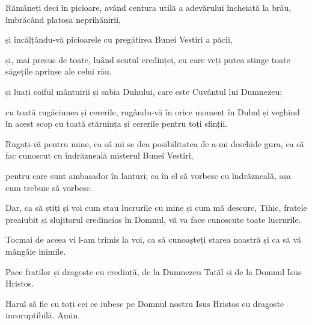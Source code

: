 {Rămâneți deci în picioare, având centura utilă a adevărului încheiată la brâu, îmbrăcând platoșa neprihănirii,

și încălțându-vă picioarele cu pregătirea Bunei Vestiri a păcii,

și, mai presus de toate, luând scutul credinței, cu care veți putea stinge toate săgețile aprinse ale celui rău.

și luați coiful mântuirii și sabia Duhului, care este Cuvântul lui Dumnezeu;

cu toată rugăciunea și cererile, rugându-vă în orice moment în Duhul și veghind în acest scop cu toată stăruința și cererile pentru toți sfinții.

Rugați-vă pentru mine, ca să mi se dea posibilitatea de a-mi deschide gura, ca să fac cunoscut cu îndrăzneală misterul Bunei Vestiri,

pentru care sunt ambasador în lanțuri; ca în el să vorbesc cu îndrăzneală, așa cum trebuie să vorbesc.


\par }{\PP {}Dar, ca să știți și voi cum stau lucrurile cu mine și cum mă descurc, Tihic, fratele preaiubit și slujitorul credincios în Domnul, vă va face cunoscute toate lucrurile.

Tocmai de aceea vi l-am trimis la voi, ca să cunoașteți starea noastră și ca să vă mângâie inimile.


\par }{\PP {}Pace fraților și dragoste cu credință, de la Dumnezeu Tatăl și de la Domnul Isus Hristos.

Harul să fie cu toți cei ce iubesc pe Domnul nostru Isus Hristos cu dragoste incoruptibilă. Amin.


\par }